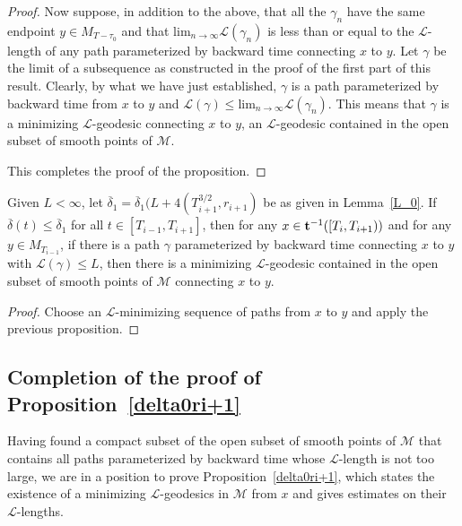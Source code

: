 \begin{proof}
Now suppose, in addition to the above, that all the $\gamma_n$
have the same endpoint $y\in M_{T-\tau_0}$ and that $\mathrm{lim}_{n\rightarrow\infty}{\mathcal L}(\gamma_n)$ is less than or equal
to the ${\mathcal L}$-length of any path parameterized by backward
time connecting $x$ to $y$. Let $\gamma$ be the limit of a
subsequence as constructed in the proof of the first part of this
result. Clearly, by what we have just established, $\gamma$ is a path
parameterized by backward time from $x$ to $y$ and ${\mathcal
L}(\gamma)\le \mathrm{lim}_{n\rightarrow\infty}{\mathcal L}(\gamma_n)$.
This means that $\gamma$ is a minimizing ${\mathcal L}$-geodesic
connecting $x$ to $y$, an ${\mathcal L}$-geodesic contained in the open subset of smooth
points of ${\mathcal M}$.

This completes the proof of the proposition.
\end{proof}


\begin{corollary}
\label{cor:minimizing-geodesic-to-earlier-slice}
\label{bardelta1}
Given $L<\infty$, let
$\overline{\delta}_1=\overline\delta_1(L+4(T_{i+1}^{3/2},r_{i+1})$ be as given in Lemma~\ref{L_0}.
If
$\overline\delta(t)\le \overline\delta_1$ for all $t\in [T_{i-1},T_{i+1}]$,
then for any $x\in {\bf t}^{-1}([T_i,T_{i+1}))$ and for any $y\in
M_{T_{i-1}}$, if there is a  path $\gamma$ parameterized by
backward time connecting $x$ to $y$ with ${\mathcal L}(\gamma)\le L$,
then there is a minimizing ${\mathcal L}$-geodesic contained in the
open subset of smooth points of ${\mathcal M}$ connecting $x$ to
$y$.
\end{corollary}

\begin{proof}
Choose an ${\mathcal L}$-minimizing sequence of paths from $x$  to
$y$ and apply the previous proposition.
\end{proof}




\subsection{Completion of the proof of Proposition~{\ref{delta0ri+1}}}

Having found a compact subset of the open subset of smooth points of ${\mathcal M}$
that contains all paths parameterized by backward time whose ${\mathcal L}$-length is not
too large, we are in a position to prove Proposition~\ref{delta0ri+1}, which states
the existence of a minimizing ${\mathcal L}$-geodesics in ${\mathcal M}$ from $x$
and gives estimates on their ${\mathcal L}$-lengths.



